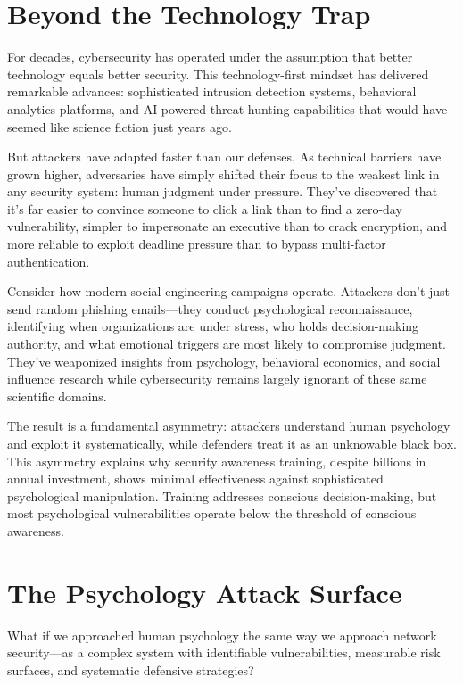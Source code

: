 \documentclass[10pt, twocolumn]{article}
\begin{document}
\section{Beyond the Technology Trap}

For decades, cybersecurity has operated under the assumption that better technology equals better security. This technology-first mindset has delivered remarkable advances: sophisticated intrusion detection systems, behavioral analytics platforms, and AI-powered threat hunting capabilities that would have seemed like science fiction just years ago.

But attackers have adapted faster than our defenses. As technical barriers have grown higher, adversaries have simply shifted their focus to the weakest link in any security system: human judgment under pressure. They've discovered that it's far easier to convince someone to click a link than to find a zero-day vulnerability, simpler to impersonate an executive than to crack encryption, and more reliable to exploit deadline pressure than to bypass multi-factor authentication.

Consider how modern social engineering campaigns operate. Attackers don't just send random phishing emails—they conduct psychological reconnaissance, identifying when organizations are under stress, who holds decision-making authority, and what emotional triggers are most likely to compromise judgment. They've weaponized insights from psychology, behavioral economics, and social influence research while cybersecurity remains largely ignorant of these same scientific domains.

The result is a fundamental asymmetry: attackers understand human psychology and exploit it systematically, while defenders treat it as an unknowable black box. This asymmetry explains why security awareness training, despite billions in annual investment, shows minimal effectiveness against sophisticated psychological manipulation. Training addresses conscious decision-making, but most psychological vulnerabilities operate below the threshold of conscious awareness.

\section{The Psychology Attack Surface}

What if we approached human psychology the same way we approach network security—as a complex system with identifiable vulnerabilities, measurable risk surfaces, and systematic defensive strategies?
\end{document}
